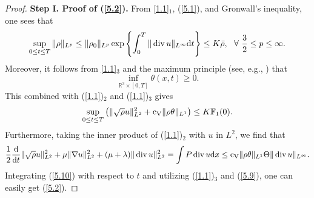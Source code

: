 \documentclass[11pt]{article}
\DeclareMathOperator{\divv}{div}
\begin{document}
\begin{proof}
{\bf Step I. Proof of (\ref{5.2}).}
From \eqref{1.1}$_1$, (\ref{5.1}), and Gronwall's inequality, one sees that
\begin{equation}\label{5.8}
\sup_{0 \leq t \leq T} \|\rho\|_{L^p}\leq \|\rho_0\|_{L^p} \exp \left\{\int^T_0 \|\divv u\|_{L^{\infty}} {\rm d} t \right\} \leq K \bar{\rho}, \ \ \forall \ \frac{3}{2} \leq p \leq \infty.
\end{equation}
Moreover, it follows from \eqref{1.1}$_3$ and the maximum principle (see, e.g., \cite{HL2018}) that
$$
\inf_{\mathbb{R}^3 \times [0,T]} \theta (x,t) \geq 0.
$$
This combined with (\ref{1.1})$_2$ and (\ref{1.1})$_3$ gives
\begin{equation}\label{5.9}
\sup_{0 \leq t \leq T} \left(\|\sqrt \rho u \|_{L^2}^2 + {\rm c_V} \|\rho \theta \|_{L^1} \right) \leq K \mathbb{F}_1 (0).
\end{equation}
Furthermore, taking the inner product of (\ref{1.1})$_2$ with $u$ in $L^2$, we find that
\begin{equation}\label{5.10}
\frac{1}{2} \frac{\mathrm{d}}{\mathrm{d} t} \|\sqrt\rho u\|_{L^2}^2 + \mu \|\nabla u\|_{L^2}^2 + (\mu + \lambda) \|\divv u\|_{L^2}^2 = \int P \divv u \mathrm{d} x \leq {\rm c_V} \|\rho \theta\|_{L^1} \Theta \|\divv u\|_{L^{\infty}}.
\end{equation}
Integrating (\ref{5.10}) with respect to $t$ and utilizing (\ref{1.1})$_3$ and (\ref{5.9}), one can easily get (\ref{5.2}).


\end{proof}
\end{document}
